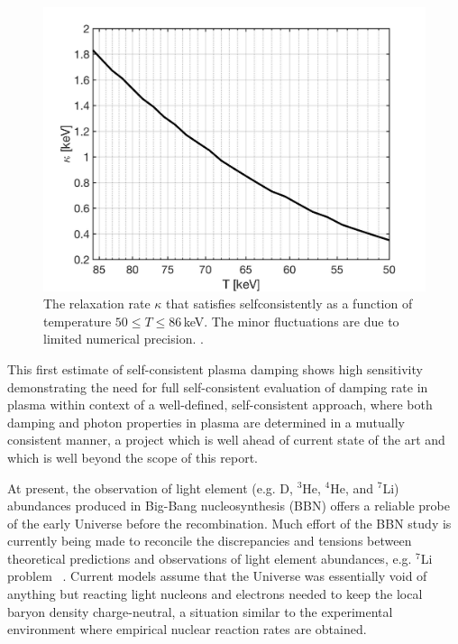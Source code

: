 \begin{figure} 
\centerline{
\includegraphics[width=0.9\linewidth]{./plots/OverdampingKappa.jpg}}
\caption{The relaxation rate $\kappa$ that satisfies  selfconsistently as a function of temperature $50\leqslant T\leqslant 86$\,keV. The minor fluctuations are due to limited numerical precision. .}
\label{KappaSol:fig} 
\end{figure}

This first estimate of self-consistent plasma damping shows high sensitivity demonstrating the need for full self-consistent evaluation of damping  rate in plasma within context  of a well-defined, self-consistent approach, where both damping and photon properties in plasma are determined in a mutually consistent manner, a project which is well ahead of current state of the art and which is well beyond the scope of this report.  






\label{sec:Discussion}
At present, the observation of light element (e.g. D, $^3$He, $^4$He, and $^7$Li) abundances produced in Big-Bang nucleosynthesis (BBN) offers a reliable probe of the early Universe before the recombination. Much effort of the BBN study is currently being made to reconcile the discrepancies and tensions between theoretical predictions and observations of light element abundances, e.g. $^7$Li problem ~\cite{Pitrou:2018cgg}.
Current models assume that the Universe was essentially void of anything but reacting light nucleons and electrons needed to keep the local baryon density charge-neutral, a situation similar to the experimental environment where empirical nuclear reaction rates are obtained.

